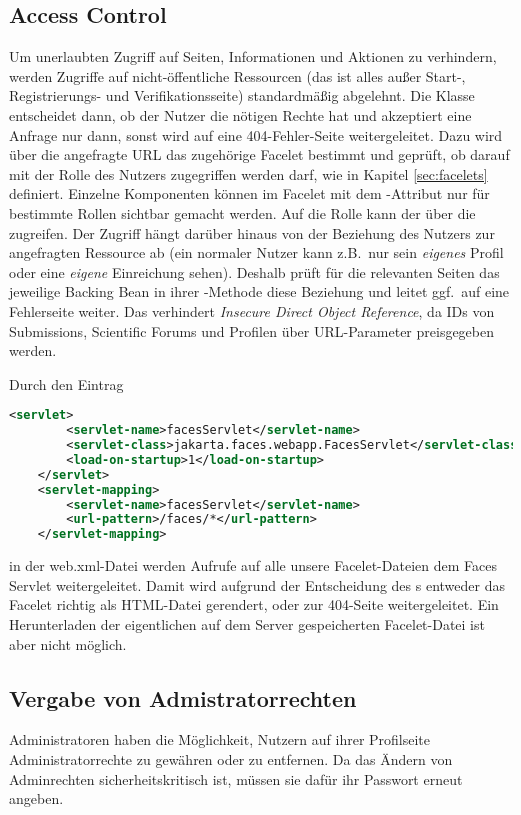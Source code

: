 \subsection{Access Control}\label{subsec:access-control}
Um unerlaubten Zugriff auf Seiten, Informationen und Aktionen zu verhindern, werden Zugriffe auf nicht-öffentliche Ressourcen (das ist alles außer Start-, Registrierungs- und Verifikationsseite) standardmäßig abgelehnt.
Die Klasse  entscheidet dann, ob der Nutzer die nötigen Rechte hat und akzeptiert eine Anfrage nur dann, sonst wird auf eine 404-Fehler-Seite weitergeleitet.
Dazu wird über die angefragte URL das zugehörige Facelet bestimmt und geprüft, ob darauf mit der Rolle des Nutzers zugegriffen werden darf, wie in Kapitel \ref{sec:facelets} definiert.
Einzelne Komponenten können im Facelet mit dem -Attribut nur für bestimmte Rollen sichtbar gemacht werden.
Auf die Rolle kann der  über die  zugreifen.
Der Zugriff hängt darüber hinaus von der Beziehung des Nutzers zur angefragten Ressource ab (ein normaler Nutzer kann z.B.\ nur sein \emph{eigenes} Profil oder eine \emph{eigene} Einreichung sehen).
Deshalb prüft für die relevanten Seiten das jeweilige Backing Bean in ihrer -Methode diese Beziehung und leitet ggf.\ auf eine Fehlerseite weiter.
Das verhindert \emph{Insecure Direct Object Reference}, da IDs von Submissions, Scientific Forums und Profilen über URL-Parameter preisgegeben werden.

Durch den Eintrag
\begin{lstlisting}[language=XML]
    <servlet>
        <servlet-name>facesServlet</servlet-name>
        <servlet-class>jakarta.faces.webapp.FacesServlet</servlet-class>
        <load-on-startup>1</load-on-startup>
    </servlet>
    <servlet-mapping>
        <servlet-name>facesServlet</servlet-name>
        <url-pattern>/faces/*</url-pattern>
    </servlet-mapping>
\end{lstlisting}
in der web.xml-Datei werden Aufrufe auf alle unsere Facelet-Dateien dem Faces Servlet weitergeleitet.
Damit wird aufgrund der Entscheidung des s entweder das Facelet richtig als HTML-Datei gerendert, oder zur 404-Seite weitergeleitet. Ein Herunterladen der eigentlichen auf dem Server gespeicherten Facelet-Datei ist aber nicht möglich.

\subsection{Vergabe von Admistratorrechten}
Administratoren haben die Möglichkeit, Nutzern auf ihrer Profilseite Administratorrechte zu gewähren oder zu entfernen.
Da das Ändern von Adminrechten sicherheitskritisch ist, müssen sie dafür ihr Passwort erneut angeben.